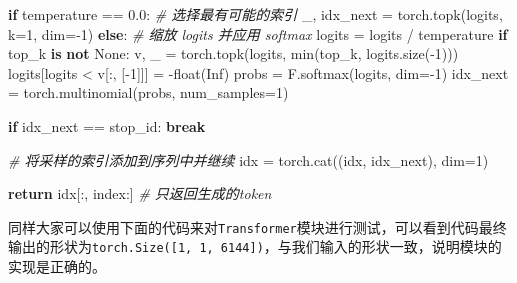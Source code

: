 \documentclass[
]{article}
\newenvironment{Shaded}{}{}
\newcommand{\BuiltInTok}[1]{\textcolor[rgb]{0.00,0.50,0.00}{#1}}
\newcommand{\CommentTok}[1]{\textcolor[rgb]{0.38,0.63,0.69}{\textit{#1}}}
\newcommand{\ControlFlowTok}[1]{\textcolor[rgb]{0.00,0.44,0.13}{\textbf{#1}}}
\newcommand{\DecValTok}[1]{\textcolor[rgb]{0.25,0.63,0.44}{#1}}
\newcommand{\FloatTok}[1]{\textcolor[rgb]{0.25,0.63,0.44}{#1}}
\newcommand{\KeywordTok}[1]{\textcolor[rgb]{0.00,0.44,0.13}{\textbf{#1}}}
\newcommand{\NormalTok}[1]{#1}
\newcommand{\OperatorTok}[1]{\textcolor[rgb]{0.40,0.40,0.40}{#1}}
\newcommand{\StringTok}[1]{\textcolor[rgb]{0.25,0.44,0.63}{#1}}
\newcommand{\VariableTok}[1]{\textcolor[rgb]{0.10,0.09,0.49}{#1}}
\begin{document}
\begin{Shaded}
\begin{Highlighting}[]
            \ControlFlowTok{if}\NormalTok{ temperature }\OperatorTok{==} \FloatTok{0.0}\NormalTok{:}
                \CommentTok{\# 选择最有可能的索引}
\NormalTok{                \_, idx\_next }\OperatorTok{=}\NormalTok{ torch.topk(logits, k}\OperatorTok{=}\DecValTok{1}\NormalTok{, dim}\OperatorTok{={-}}\DecValTok{1}\NormalTok{)}
            \ControlFlowTok{else}\NormalTok{:}
                \CommentTok{\# 缩放 logits 并应用 softmax}
\NormalTok{                logits }\OperatorTok{=}\NormalTok{ logits }\OperatorTok{/}\NormalTok{ temperature}
                \ControlFlowTok{if}\NormalTok{ top\_k }\KeywordTok{is} \KeywordTok{not} \VariableTok{None}\NormalTok{:}
\NormalTok{                    v, \_ }\OperatorTok{=}\NormalTok{ torch.topk(logits, }\BuiltInTok{min}\NormalTok{(top\_k, logits.size(}\OperatorTok{{-}}\DecValTok{1}\NormalTok{)))}
\NormalTok{                    logits[logits }\OperatorTok{\textless{}}\NormalTok{ v[:, [}\OperatorTok{{-}}\DecValTok{1}\NormalTok{]]] }\OperatorTok{=} \OperatorTok{{-}}\BuiltInTok{float}\NormalTok{(}\StringTok{\textquotesingle{}Inf\textquotesingle{}}\NormalTok{)}
\NormalTok{                probs }\OperatorTok{=}\NormalTok{ F.softmax(logits, dim}\OperatorTok{={-}}\DecValTok{1}\NormalTok{)}
\NormalTok{                idx\_next }\OperatorTok{=}\NormalTok{ torch.multinomial(probs, num\_samples}\OperatorTok{=}\DecValTok{1}\NormalTok{)}
            

            \ControlFlowTok{if}\NormalTok{ idx\_next }\OperatorTok{==}\NormalTok{ stop\_id:}
                \ControlFlowTok{break}

            \CommentTok{\# 将采样的索引添加到序列中并继续}
\NormalTok{            idx }\OperatorTok{=}\NormalTok{ torch.cat((idx, idx\_next), dim}\OperatorTok{=}\DecValTok{1}\NormalTok{)}

        \ControlFlowTok{return}\NormalTok{ idx[:, index:] }\CommentTok{\# 只返回生成的token}
\end{Highlighting}
\end{Shaded}

同样大家可以使用下面的代码来对\texttt{Transformer}模块进行测试，可以看到代码最终输出的形状为\texttt{torch.Size({[}1,\ 1,\ 6144{]})}，与我们输入的形状一致，说明模块的实现是正确的。
\end{document}

